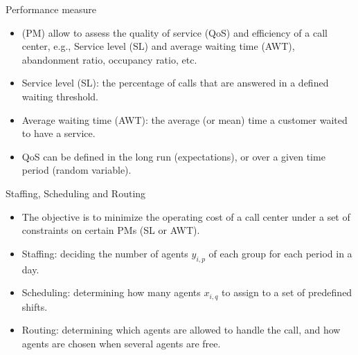 \documentclass{beamer}
\begin{document}
\begin{frame}{Performance measure}
	\begin{itemize}
		\item{} {\color{blue}{Performance measures} (PM)} allow to assess the quality of service (QoS) and
		efficiency of a call center, e.g., Service level (SL) and average waiting time (AWT), abandonment ratio, occupancy ratio, etc.
		\item {\color{blue}Service level (SL)}: the percentage of calls that are answered in a defined waiting threshold.
		\item {\color{blue}Average waiting time (AWT)}: the average (or mean) time a customer waited to have a service.
		\item{} QoS can be defined in the long run (expectations), or over a given time period (random variable).
	\end{itemize}
\end{frame}

\begin{frame}{Staffing, Scheduling and Routing}
	\begin{itemize}
		\item{} The objective is to minimize the operating cost of a call center under a set of constraints on certain PMs (SL or AWT).
		\item{} Staffing: deciding the number of agents $y_{i,p}$ of each group for each period in a day.
		\item{} Scheduling:  determining how many agents $x_{i,q}$ to assign to a set of predefined shifts.
		\item{} Routing: determining which agents are allowed to handle the call, and how agents are chosen when several agents are free.
		
	\end{itemize}
\end{frame}
\end{document}
